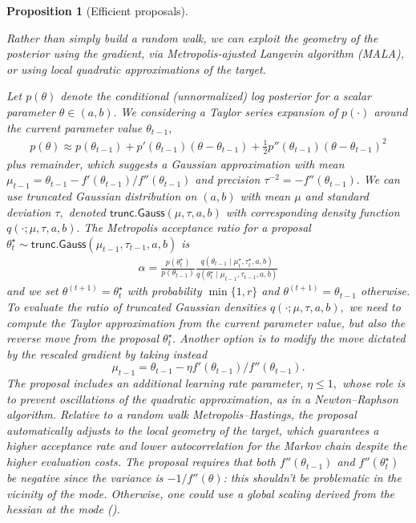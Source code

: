 \documentclass[
  11pt,
  letterpaper,
]{scrbook}
\theoremstyle{definition}
\theoremstyle{plain}
\newtheorem{proposition}{Proposition}[chapter]
\theoremstyle{plain}
\theoremstyle{plain}
\theoremstyle{definition}
\theoremstyle{definition}
\theoremstyle{plain}
\newtheorem{proposition}{Proposition}[chapter]
\theoremstyle{plain}
\theoremstyle{remark}
\begin{document}
\begin{proposition}[Efficient
proposals]\protect\hypertarget{prp-mala}{}\label{prp-mala}

Rather than simply build a random walk, we can exploit the geometry of
the posterior using the gradient, via Metropolis-ajusted Langevin
algorithm (MALA), or using local quadratic approximations of the target.

Let \(p(\theta)\) denote the conditional (unnormalized) log posterior
for a scalar parameter \(\theta \in (a, b).\) We considering a Taylor
series expansion of \(p(\cdot)\) around the current parameter value
\(\theta_{t-1},\) \begin{align*}
 p(\theta) \approx p(\theta_{t-1}) + p'(\theta_{t-1})(\theta - \theta_{t-1}) + \frac{1}{2} p''(\theta_{t-1})(\theta - \theta_{t-1})^2
\end{align*} plus remainder, which suggests a Gaussian approximation
with mean
\(\mu_{t-1} = \theta_{t-1} - f'(\theta_{t-1})/f''(\theta_{t-1})\) and
precision \(\tau^{-2} = -f''(\theta_{t-1}).\) We can use truncated
Gaussian distribution on \((a, b)\) with mean \(\mu\) and standard
deviation \(\tau,\) denoted \(\mathsf{trunc. Gauss}(\mu, \tau, a, b)\)
with corresponding density function \(q(\cdot; \mu, \tau, a, b).\) The
Metropolis acceptance ratio for a proposal
\(\theta^{\star}_{t} \sim \mathsf{trunc. Gauss}(\mu_{t-1}, \tau_{t-1}, a, b)\)
is \begin{align*}
 \alpha = \frac{p(\theta^{\star}_{t})}{p(\theta_{t-1})} \frac{ q(\theta_{t-1} \mid \mu_{t}^{\star}, \tau_{t}^{\star}, a, b)}{q(\theta^{\star}_{t} \mid \mu_{t-1}, \tau_{t-1}, a, b)}
\end{align*} and we set \(\theta^{(t+1)} = \theta^{\star}_{t}\) with
probability \(\min\{1, r\}\) and \(\theta^{(t+1)} = \theta_{t-1}\)
otherwise. To evaluate the ratio of truncated Gaussian densities
\(q(\cdot; \mu, \tau, a, b),\) we need to compute the Taylor
approximation from the current parameter value, but also the reverse
move from the proposal \(\theta^{\star}_{t}.\) Another option is to
modify the move dictated by the rescaled gradient by taking instead
\[\mu_{t-1} = \theta_{t-1} - \eta f'(\theta_{t-1})/f''(\theta_{t-1}).\]
The proposal includes an additional learning rate parameter,
\(\eta \leq 1,\) whose role is to prevent oscillations of the quadratic
approximation, as in a Newton--Raphson algorithm. Relative to a random
walk Metropolis--Hastings, the proposal automatically adjusts to the
local geometry of the target, which guarantees a higher acceptance rate
and lower autocorrelation for the Markov chain despite the higher
evaluation costs. The proposal requires that both \(f''(\theta_{t-1})\)
and \(f''(\theta^{\star}_{t})\) be negative since the variance is
\(-1/f''(\theta)\): this shouldn't be problematic in the vicinity of the
mode. Otherwise, one could use a global scaling derived from the hessian
at the mode ().


\end{proposition}
\end{document}
